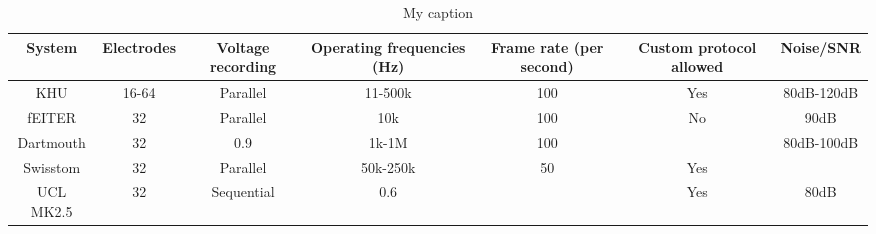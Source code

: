 \begin{table}[]
\centering
\caption{My caption}
\label{my-label}
\begin{tabular}{|c|c|c|c|c|c|c|}
\hline
\textbf{System} & \textbf{Electrodes} & \textbf{Voltage recording} & \textbf{Operating frequencies (Hz)} & \textbf{Frame rate (per second)} & \textbf{Custom protocol allowed} & \textbf{Noise/SNR} \\ \hline
KHU             & 16-64               & Parallel                   & 11-500k                             & 100                              & Yes                              & 80dB-120dB         \\ \hline
fEITER          & 32                  & Parallel                   & 10k                                 & 100                              & No                               & 90dB               \\ \hline
Dartmouth       & 32                  & 0.9                        & 1k-1M                               & 100                              &                                  & 80dB-100dB         \\ \hline
Swisstom        & 32                  & Parallel                   & 50k-250k                            & 50                               & Yes                              &                    \\ \hline
UCL MK2.5       & 32                  & Sequential                 & 0.6                                 &                                  & Yes                              & 80dB               \\ \hline
\end{tabular}
\end{table}